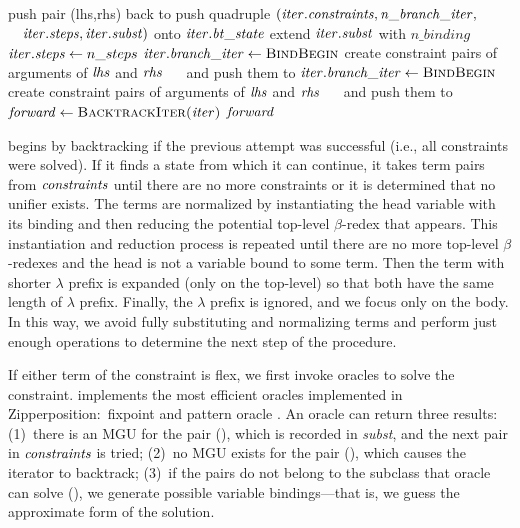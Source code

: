\begin{algorithmic}[]
          \State push pair (lhs,rhs) back to 
          \State push quadruple $(\mathit{iter.constraints}, \mathit{n\_branch\_iter}, $
          \State                  $\quad \mathit{iter.steps}, \mathit{iter.subst})$ onto $\mathit{iter.bt\_state}$
          \State extend $\mathit{iter.subst}$ with $n\_binding$
          \State $\mathit{iter.steps} \gets n\_steps$
          \State $\mathit{iter.branch\_iter} \gets \textsc{BindBegin}$
          \State create constraint pairs of arguments of $\mathit{lhs}$ and $\mathit{rhs}$
          \State $\quad$ and push them to 
          \State $\mathit{iter.branch\_iter} \gets \textsc{BindBegin}$
        \EndIf
      \EndIf
      \State create constraint pairs of arguments of $\mathit{lhs}$ and $\mathit{rhs}$
      \State $\quad$ and push them to 
    \Else{} $\mathit{forward} \gets \textsc{BacktrackIter(\ensuremath{\mathit{iter}})}$
    \EndIf
  \EndWhile
  \State \Return $\mathit{forward}$
  \EndFunction
\end{algorithmic} 

 begins by backtracking if the previous attempt was successful (i.e., 
all constraints were solved). If it finds a state from which it can continue,
it takes term pairs from $\mathit{constraints}$ until
there are no more constraints or it is determined that no unifier exists. The terms
are normalized by instantiating the head variable with its binding and then
reducing the potential top-level $\beta$-redex that appears. This instantiation
and reduction process is repeated
until there are no more top-level $\beta$-redexes and the head is
not a variable bound to some term. Then the term with shorter
$\lambda$ prefix is expanded (only on the top-level) so that both have the
same length of $\lambda$ prefix. Finally, the $\lambda$ prefix is ignored, and we
focus only on the body. In this way, we avoid fully substituting
and normalizing terms and perform just enough operations
to determine the next step of the procedure.

If either term of the constraint is flex, we first invoke oracles to solve the
constraint. \ehohii{} implements the most efficient oracles implemented in
Zipperposition:\ fixpoint and pattern oracle
\cite[Sect.~6]{unif-section}. An oracle can return three results:
(1)~there is an MGU for the pair (), which is recorded in
\emph{subst}, and the next pair in $\emph{constraints}$ is tried;
(2)~no MGU exists
for the pair (), which causes the iterator to backtrack;
(3)~if the pairs do not belong to the subclass that oracle
can solve (), we generate possible variable bindings---that is,
we guess the approximate form of the solution.

